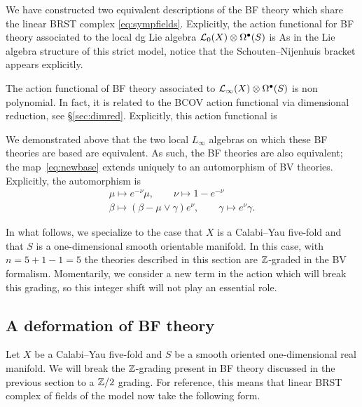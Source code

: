 We have constructed two equivalent descriptions of the BF theory which share the linear BRST complex \eqref{eq:sympfields}.
Explicitly, the action functional for BF theory associated to the local dg Lie algebra $\mathcal L_0(X) \otimes \Omega^{\bullet}(S)$ is
As in the Lie algebra structure of this strict model, notice that the Schouten--Nijenhuis bracket appears explicitly. 

The action functional of BF theory associated to $\mathcal L_\infty(X) \otimes \Omega^{\bullet}(S)$ is non polynomial. 
In fact, it is related to the BCOV action functional via dimensional reduction, see \S \ref{sec:dimred}.
Explicitly, this action functional is

We demonstrated above that the two local $L_\infty$ algebras on which these BF theories are based are equivalent. As such, the BF theories are also equivalent; the map~\eqref{eq:newbase} extends uniquely to an automorphism of BV theories.
Explicitly, the automorphism is
\begin{multline}\label{eqn:auto1}
  \mu \mapsto e^{-\nu} \mu, \qquad \nu \mapsto 1-e^{-\nu} \\
  \beta \mapsto (\beta - \mu \vee \gamma) e^{\nu},\qquad \gamma \mapsto e^{\nu} \gamma .
\end{multline}

\parsec[]

In what follows, we specialize to the case that $X$ is a Calabi--Yau five-fold and that $S$ is a one-dimensional smooth orientable manifold. 
In this case, with $n = 5 + 1 - 1 = 5$ the theories described in this section are $\mathbb Z$-graded in the BV formalism.
Momentarily, we consider a new term in the action which will break this grading, so this integer shift will not play an essential role.

\subsection{A deformation of BF theory} 

Let $X$ be a Calabi--Yau five-fold and $S$ be a smooth oriented one-dimensional real manifold. 
We will break the $\mathbb Z$-grading present in BF theory discussed in the previous section to a $\mathbb Z/2$ grading. 
For reference, this means that linear BRST complex of fields of the model now take the following form. 

